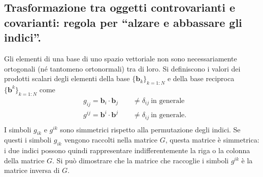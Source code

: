  \subsection{Trasformazione tra oggetti controvarianti e covarianti: regola per ``alzare e abbassare gli indici''.}
  Gli elementi di una base di uno spazio vettoriale non sono necessariamente ortogonali (né tantomeno ortonormali) tra di loro. Si definiscono i valori dei prodotti scalari degli elementi della base $\{ \bm{b}_k \}_{k=1:N}$ e della base 
  reciproca $\{ \bm{b}^k \}_{k=1:N}$ come
  \begin{equation}
  \begin{aligned}
 &    g_{ij} = \bm{b}_i \cdot \bm{b}_j \qquad \neq \delta_{ij} \ \text{in generale}   \\
 &    g^{ij} = \bm{b}^i \cdot \bm{b}^j \qquad \neq \delta_{ij} \ \text{in generale} . \\
  \end{aligned}
  \end{equation}
I simboli $g_{ik}$ e $g^{ik}$ sono simmetrici rispetto alla permutazione degli indici. Se questi i simboli $g_{ik}$ vengono raccolti nella matrice $G$, questa matrice è simmetrica: i due indici possono quindi rappresentare indifferentemente la riga o la colonna della matrice $G$. Si può dimostrare che la matrice che raccoglie i simboli $g^{ik}$ è la matrice inversa di $G$.

